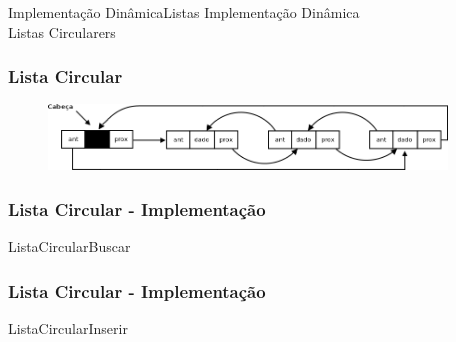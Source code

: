 \documentclass[aspectratio=169]{beamer}
\begin{document}
\begin{frame}{Implementação Dinâmica}{Listas}
\centering
\huge{Implementação Dinâmica\\
Listas Circularers
}
\end{frame}


\begin{frame}
\frametitle{Lista Circular}
\begin{figure}[!h]
  \centering
  \includegraphics[width=300pt]{imgs/lista_circular.png}
  \label{lista_circular}
\end{figure}
\end{frame}


\begin{frame}
\frametitle{Lista Circular - Implementação}
\begin{algorithm}[H]
\caption{ListaCircularBuscar} 
\label{ListaBuscar}
\end{algorithm}
\end{frame}


\begin{frame}
\frametitle{Lista Circular - Implementação}
\begin{algorithm}[H]
\caption{ListaCircularInserir} 
\label{ListaCircularInserir}
\end{algorithm}
\end{frame}
\end{document}
